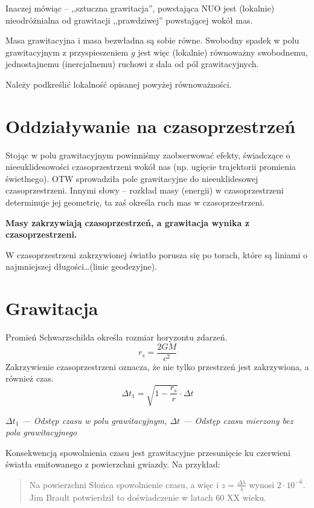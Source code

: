 \documentclass [a4paper, 11pt, oneside]{book}
\begin{document}
			Inaczej mówiąc -- ,,sztuczna grawitacja'', powstająca NUO jest (lokalnie) nieodróżnialna od grawitacji ,,prawdziwej'' powstającej wokół mas.

			Masa grawitacyjna i masa bezwładna są sobie równe. Swobodny spadek w polu grawitacyjnym z przyspieszeniem $g$ jest więc (lokalnie) równoważny swobodnemu, jednostajnemu (inercjalnemu) ruchowi z dala od pól grawitacyjnych.

			Należy podkreślić lokalność opisanej powyżej równoważności.

	\section{Oddziaływanie na czasoprzestrzeń} %
	\label{sec:oddzia_ywanie_na_czasoprzestrze_}
		Stojąc w polu grawitacyjnym powinniśmy zaobserwować efekty, świadczące o nieeuklidesowości czasoprzestrzeni wokół nas (np. ugięcie trajektorii promienia świetlnego). OTW sprowadziła pole grawitacyjne do nieeuklidesowej czasoprzestrzeni. Innymi słowy -- rozkład masy (energii) w czasoprzestrzeni determinuje jej geometrię, ta zaś określa ruch mas w czasoprzestrzeni.
		\begin{center}
			\textbf{Masy zakrzywiają czasoprzestrzeń, a grawitacja wynika z czasoprzestrzeni.}
		\end{center}
		W czasoprzestrzeni zakrzywionej światło porusza się po torach, które są liniami o najmniejszej długości\dots (linie geodezyjne).

	\section{Grawitacja} %
	\label{sec:grawitacja}
		Promień Schwarzschilda określa rozmiar horyzontu zdarzeń.
		\[
			r_s = \frac{2GM}{c^2}
		\]
		Zakrzywienie czasoprzestrzeni oznacza, że nie tylko przestrzeń jest zakrzywiona, a również czas.
		\[
			\Delta t_1 = \sqrt{1-\frac{r_s}{r}}\cdot\Delta t
		\]
		\begin{flushright}
			\it $\Delta t_1$ --- Odstęp czasu w polu grawitacyjnym, $\Delta t$ --- Odstęp czasu mierzony bez pola grawitacyjnego
		\end{flushright}

		Konsekwencją spowolnienia czasu jest grawitacyjne przesunięcie ku czerwieni światła emitowanego z powierzchni gwiazdy. Na przykład:
		\begin{quote}Na powierzchni Słońca spowolnienie czasu, a więc i $z = \frac{\Delta\lambda}{\lambda}$ wynosi $2\cdot10^{-6}$. Jim Brault potwierdził to doświadczenie w latach 60 XX wieku.\end{quote}
\end{document}
